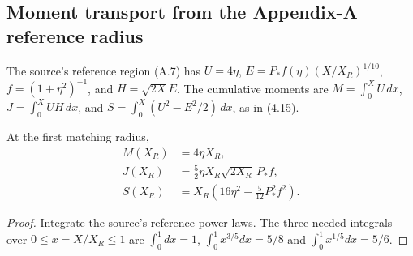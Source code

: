 \subsection*{Moment transport from the Appendix-A reference radius}
The source's reference region (A.7) has
$U=4\eta$, $E=P_*f(\eta)(X/X_R)^{1/10}$,
$f=(1+\eta^2)^{-1}$, and $H=\sqrt{2X}E$.
The cumulative moments are $M=\int_0^XU\,dx$,
$J=\int_0^XUH\,dx$, and
$S=\int_0^X(U^2-E^2/2)\,dx$, as in (4.15).

\begin{proposition}
At the first matching radius,
\begin{equation}\label{eq:source-ref-MJS}
\begin{aligned}
M(X_R)&=4\eta X_R,\\
J(X_R)&=\frac52\eta X_R\sqrt{2X_R}\,P_*f,\\
S(X_R)&=X_R\left(16\eta^2-\frac5{12}P_*^2f^2\right).
\end{aligned}
\end{equation}
\end{proposition}
\begin{proof}
Integrate the source's reference power laws. The three needed
integrals over $0\le x=X/X_R\le1$ are
$\int_0^1dx=1$,
$\int_0^1x^{3/5}dx=5/8$ and
$\int_0^1x^{1/5}dx=5/6$.
\end{proof}

